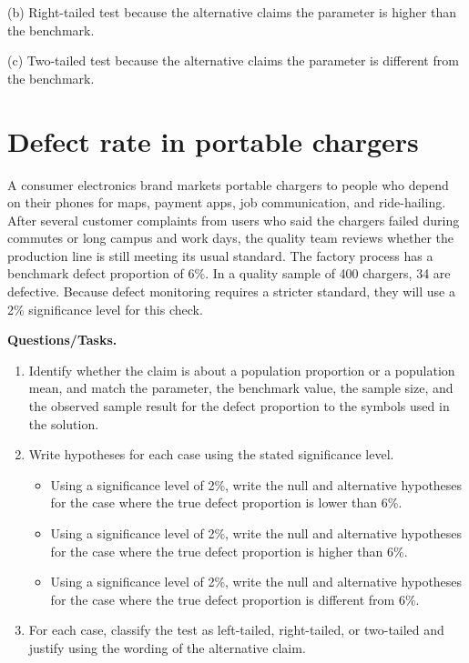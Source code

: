 \begin{ExamProblems}
		(b) Right-tailed test because the alternative claims the parameter is higher than the benchmark.\RightTailGraph
		
		(c) Two-tailed test because the alternative claims the parameter is different from the benchmark.\TwoTailGraph
		
		\item
		\section{Defect rate in portable chargers}
		A consumer electronics brand markets portable chargers to people who depend on their phones for maps, payment apps, job communication, and ride-hailing. After several customer complaints from users who said the chargers failed during commutes or long campus and work days, the quality team reviews whether the production line is still meeting its usual standard. The factory process has a benchmark defect proportion of 6\%. In a quality sample of 400 chargers, 34 are defective. Because defect monitoring requires a stricter standard, they will use a 2\% significance level for this check.
		
		\textbf{Questions/Tasks.}
		\begin{enumerate}
			\item[(C1)] Identify whether the claim is about a population proportion or a population mean, and match the parameter, the benchmark value, the sample size, and the observed sample result for the defect proportion to the symbols used in the solution.
			\item[(C2)] Write hypotheses for each case using the stated significance level.
			\begin{itemize}
				\item[(a)] Using a significance level of 2\%, write the null and alternative hypotheses for the case where the true defect proportion is lower than 6\%.
				\item[(b)] Using a significance level of 2\%, write the null and alternative hypotheses for the case where the true defect proportion is higher than 6\%.
				\item[(c)] Using a significance level of 2\%, write the null and alternative hypotheses for the case where the true defect proportion is different from 6\%.
			\end{itemize}
			\item[(C3)] For each case, classify the test as left-tailed, right-tailed, or two-tailed and justify using the wording of the alternative claim.
		\end{enumerate}
		

\end{ExamProblems}
